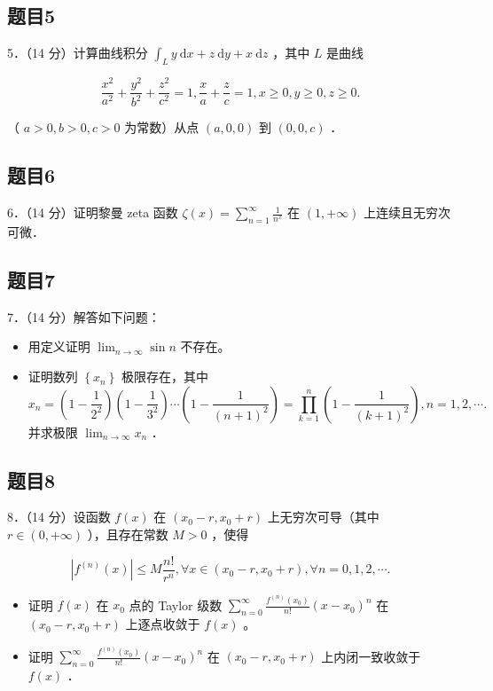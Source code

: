 \documentclass{article}
\begin{document}
\subsection{题目5}
5．（14 分）计算曲线积分 \(\int_{L} y \mathrm{~d} x+z \mathrm{~d} y+x \mathrm{~d} z\) ，其中 \(L\) 是曲线

\[
\frac{x^{2}}{a^{2}}+\frac{y^{2}}{b^{2}}+\frac{z^{2}}{c^{2}}=1, \frac{x}{a}+\frac{z}{c}=1, x \geq 0, y \geq 0, z \geq 0 .
\]

（ \(a>0, b>0, c>0\) 为常数）从点 \((a, 0,0)\) 到 \((0,0, c)\) ．

\subsection{题目6}
6．（14 分）证明黎曼 zeta 函数 \(\zeta(x)=\sum_{n=1}^{\infty} \frac{1}{n^{x}}\) 在 \((1,+\infty)\) 上连续且无穷次可微．

\subsection{题目7}
7．（14 分）解答如下问题：

\begin{itemize}
  \item[（1）] 用定义证明 \(\lim _{n \rightarrow \infty} \sin n\) 不存在。
  \item[（2）] 证明数列 \(\left\{x_{n}\right\}\) 极限存在，其中
\[
x_{n}=\left(1-\frac{1}{2^{2}}\right)\left(1-\frac{1}{3^{2}}\right) \cdots\left(1-\frac{1}{(n+1)^{2}}\right)=\prod_{k=1}^{n}\left(1-\frac{1}{(k+1)^{2}}\right), n=1,2, \cdots .
\]
并求极限 \(\lim _{n \rightarrow \infty} x_{n}\) ．
\end{itemize}

\subsection{题目8}
8．（14 分）设函数 \(f(x)\) 在 \(\left(x_{0}-r, x_{0}+r\right)\) 上无穷次可导（其中 \(r \in(0,+\infty)\) ），且存在常数 \(M>0\) ，使得

\[
\left|f^{(n)}(x)\right| \leq M \frac{n!}{r^{n}}, \forall x \in\left(x_{0}-r, x_{0}+r\right), \forall n=0,1,2, \cdots .
\]

\begin{itemize}
  \item[（1）] 证明 \(f(x)\) 在 \(x_{0}\) 点的 Taylor 级数 \(\sum_{n=0}^{\infty} \frac{f^{(n)}\left(x_{0}\right)}{n!}\left(x-x_{0}\right)^{n}\) 在 \(\left(x_{0}-r, x_{0}+r\right)\) 上逐点收敛于 \(f(x)\) 。
  \item[（2）] 证明 \(\sum_{n=0}^{\infty} \frac{f^{(n)}\left(x_{0}\right)}{n!}\left(x-x_{0}\right)^{n}\) 在 \(\left(x_{0}-r, x_{0}+r\right)\) 上内闭一致收敛于 \(f(x)\) ．
\end{itemize}
\end{document}
